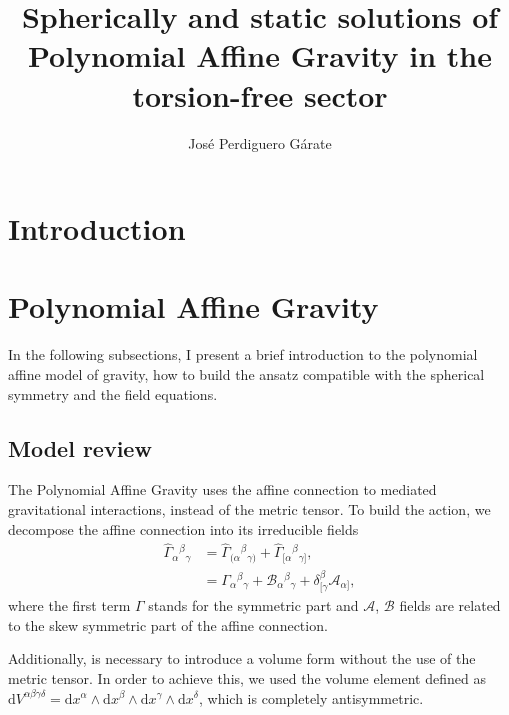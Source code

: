 \documentclass{article}
\title{Spherically and static solutions of Polynomial Affine Gravity in the torsion-free sector}
\author{Jos\'e Perdiguero G\'arate}
\begin{document}
\maketitle
\tableofcontents

\section{Introduction}
\label{sec:Introduction}



\section{Polynomial Affine Gravity}
\label{sec:PAG}

In the following subsections, I present a brief introduction
to the polynomial affine model of gravity, how to build the
ansatz compatible with the spherical symmetry and the field 
equations.

\subsection{Model review}
\label{subsec: model_review}

The Polynomial Affine Gravity uses the affine connection to mediated 
gravitational interactions, instead of the metric tensor. To build 
the action, we decompose the affine connection into its irreducible
fields
\begin{equation}
\begin{aligned}
    \label{affine_connection}
    \hat{\Gamma}_{\alpha}{}^{\beta}{}_{\gamma} & = \hat{\Gamma}_{(\alpha}{}^{\beta}{}_{\gamma)} +  \hat{\Gamma}_{[\alpha}{}^{\beta}{}_{\gamma]},  \\
    & = \Gamma_{\alpha}{}^{\beta}{}_{\gamma} + \mathcal{B}_{\alpha}{}^{\beta}{}_{\gamma} + \delta^{\beta}_{[\gamma}\mathcal{A}_{\alpha]},
\end{aligned}
\end{equation}
where the first term $\Gamma$ stands for the symmetric part and 
$\mathcal{A}$, $\mathcal{B}$ fields are related to the skew symmetric
part of the affine connection. 

Additionally, is necessary to introduce a volume form without
the use of the metric tensor. In order to achieve this, we used
the volume element defined as $\mathrm{d}V^{\alpha \beta \gamma \delta} 
= \mathrm{d}x^\alpha \wedge \mathrm{d}x^\beta \wedge \mathrm{d}x^\gamma
\wedge \mathrm{d}x^\delta$, which is completely antisymmetric.
\end{document}
